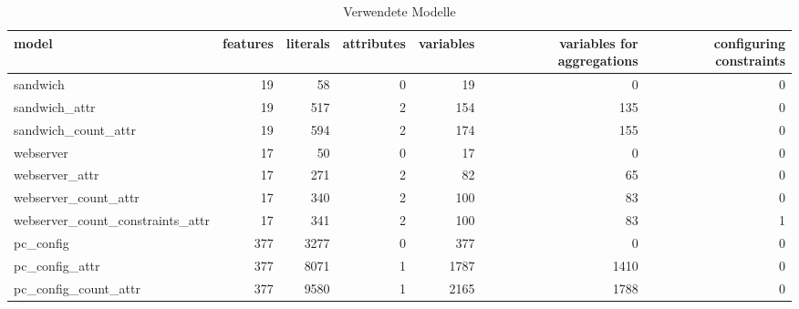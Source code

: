 \begin{table}
\centering
\caption{Verwendete Modelle}
\begin{tabular}{lrrrrrr}
\toprule
                           model &  features &  literals &  attributes &  variables &  variables for aggregations &  configuring constraints \\
\midrule
                        sandwich &        19 &        58 &           0 &         19 &                           0 &                        0 \\
                   sandwich\_attr &        19 &       517 &           2 &        154 &                         135 &                        0 \\
             sandwich\_count\_attr &        19 &       594 &           2 &        174 &                         155 &                        0 \\
                       webserver &        17 &        50 &           0 &         17 &                           0 &                        0 \\
                  webserver\_attr &        17 &       271 &           2 &         82 &                          65 &                        0 \\
            webserver\_count\_attr &        17 &       340 &           2 &        100 &                          83 &                        0 \\
webserver\_count\_constraints\_attr &        17 &       341 &           2 &        100 &                          83 &                        1 \\
                       pc\_config &       377 &      3277 &           0 &        377 &                           0 &                        0 \\
                  pc\_config\_attr &       377 &      8071 &           1 &       1787 &                        1410 &                        0 \\
            pc\_config\_count\_attr &       377 &      9580 &           1 &       2165 &                        1788 &                        0 \\
\bottomrule
\end{tabular}
\end{table}
